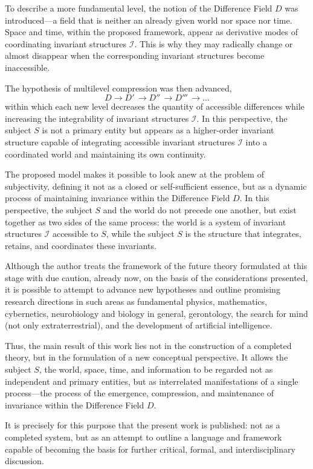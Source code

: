 \documentclass[aps,prd,onecolumn,nofootinbib,superscriptaddress]{revtex4-2} %
\begin{document}
    To describe a more fundamental level, the notion of the Difference Field \(D\) was introduced—a field that is neither an already given world nor space nor time. Space and time, within the proposed framework, appear as derivative modes of coordinating invariant structures \(\mathcal{I}\). This is why they may radically change or almost disappear when the corresponding invariant structures become inaccessible.

    The hypothesis of multilevel compression was then advanced,
    \[ D \to D'\, \to D''\, \to D'''\, \to \dots \]
    within which each new level decreases the quantity of accessible differences while increasing the integrability of invariant structures \(\mathcal{I}\). In this perspective, the subject \(S\) is not a primary entity but appears as a higher-order invariant structure capable of integrating accessible invariant structures \(\mathcal{I}\) into a coordinated world and maintaining its own continuity.

    The proposed model makes it possible to look anew at the problem of subjectivity, defining it not as a closed or self-sufficient essence, but as a dynamic process of maintaining invariance within the Difference Field \(D\). In this perspective, the subject \(S\) and the world do not precede one another, but exist together as two sides of the same process: the world is a system of invariant structures \(\mathcal{I}\) accessible to \(S\), while the subject \(S\) is the structure that integrates, retains, and coordinates these invariants.

    Although the author treats the framework of the future theory formulated at this stage with due caution, already now, on the basis of the considerations presented, it is possible to attempt to advance new hypotheses and outline promising research directions in such areas as fundamental physics, mathematics, cybernetics, neurobiology and biology in general, gerontology, the search for mind (not only extraterrestrial), and the development of artificial intelligence.

    Thus, the main result of this work lies not in the construction of a completed theory, but in the formulation of a new conceptual perspective. It allows the subject \(S\), the world, space, time, and information to be regarded not as independent and primary entities, but as interrelated manifestations of a single process—the process of the emergence, compression, and maintenance of invariance within the Difference Field \(D\).

    It is precisely for this purpose that the present work is published: not as a completed system, but as an attempt to outline a language and framework capable of becoming the basis for further critical, formal, and interdisciplinary discussion.
\end{document}
